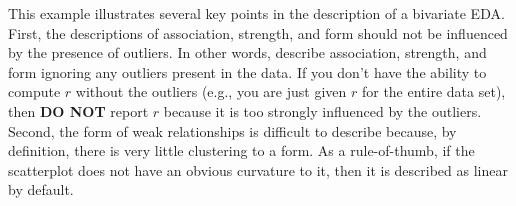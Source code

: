 \documentclass[10pt,openany]{book}\usepackage[]{graphicx}\usepackage[]{color}
\begin{document}
This example illustrates several key points in the description of a bivariate EDA.  First, the descriptions of association, strength, and form should not be influenced by the presence of outliers.  In other words, describe association, strength, and form ignoring any outliers present in the data.  If you don't have the ability to compute $r$ without the outliers (e.g., you are just given $r$ for the entire data set), then \textbf{DO NOT} report $r$ because it is too strongly influenced by the outliers.  Second, the form of weak relationships is difficult to describe because, by definition, there is very little clustering to a form.  As a rule-of-thumb, if the scatterplot does not have an obvious curvature to it, then it is described as linear by default.


\vspace{-12pt}
\end{document}
